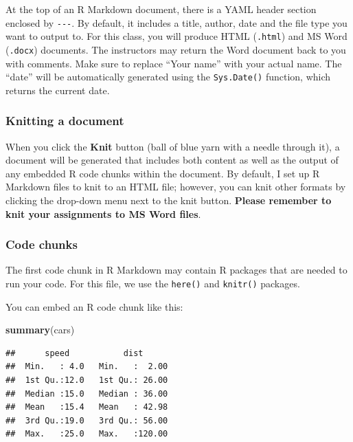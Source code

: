 \documentclass[
]{article}
\newenvironment{Shaded}{\begin{snugshade}}{\end{snugshade}}
\newcommand{\FunctionTok}[1]{\textcolor[rgb]{0.13,0.29,0.53}{\textbf{#1}}}
\newcommand{\NormalTok}[1]{#1}
\begin{document}
At the top of an R Markdown document, there is a YAML header section
enclosed by \texttt{-\/-\/-}. By default, it includes a title, author,
date and the file type you want to output to. For this class, you will
produce HTML (\texttt{.html}) and MS Word (\texttt{.docx}) documents.
The instructors may return the Word document back to you with comments.
Make sure to replace ``Your name'' with your actual name. The ``date''
will be automatically generated using the \texttt{Sys.Date()} function,
which returns the current date.

\subsubsection{\texorpdfstring{\textbf{Knitting a
document}}{Knitting a document}}\label{knitting-a-document}

When you click the \textbf{Knit} button (ball of blue yarn with a needle
through it), a document will be generated that includes both content as
well as the output of any embedded R code chunks within the document. By
default, I set up R Markdown files to knit to an HTML file; however, you
can knit other formats by clicking the drop-down menu next to the knit
button. \textbf{Please remember to knit your assignments to MS Word
files}.

\subsubsection{\texorpdfstring{\textbf{Code
chunks}}{Code chunks}}\label{code-chunks}

The first code chunk in R Markdown may contain R packages that are
needed to run your code. For this file, we use the \texttt{here()} and
\texttt{knitr()} packages.

You can embed an R code chunk like this:

\begin{Shaded}
\begin{Highlighting}[]
\FunctionTok{summary}\NormalTok{(cars)}
\end{Highlighting}
\end{Shaded}

\begin{verbatim}
##      speed           dist       
##  Min.   : 4.0   Min.   :  2.00  
##  1st Qu.:12.0   1st Qu.: 26.00  
##  Median :15.0   Median : 36.00  
##  Mean   :15.4   Mean   : 42.98  
##  3rd Qu.:19.0   3rd Qu.: 56.00  
##  Max.   :25.0   Max.   :120.00
\end{verbatim}
\end{document}
